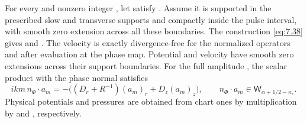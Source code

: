 \begin{lemma}\label{lem:7.7}
For every  and nonzero integer
, let  satisfy
. Assume it
is supported in the prescribed slow and transverse supports and compactly inside the pulse interval,
with smooth zero extension across all these boundaries. The construction \eqref{eq:7.38} gives
and . The velocity
 is exactly divergence-free for the
normalized operators and after evaluation at the phase map. Potential and velocity have smooth zero
extensions across their support boundaries. For the full amplitude
, the scalar product
with the phase normal satisfies
\begin{equation}
  ikm\,n_\Phi\cdot a_m
  =-\bigl((D_r+R^{-1})(a_m)_r+D_z(a_m)_z\bigr),
  \qquad n_\Phi\cdot a_m\in \mathsf W_{\alpha+1/2-\kappa_s}.
\tag{7.39}\label{eq:7.39}
\end{equation}
Physical potentials and pressures are obtained from chart ones by multiplication by
 and , respectively.
\end{lemma}

